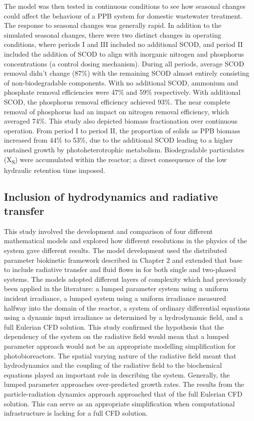 The model was then tested in continuous conditions to see how seasonal changes could affect the behaviour of a PPB system for domestic wastewater treatment. The response to seasonal changes was generally rapid. In addition to the simulated seasonal changes, there were two distinct changes in operating conditions, where periods I and III included no additional SCOD, and period II included the addition of SCOD to align with inorganic nitrogen and phosphorus concentrations (a control dosing mechanism). During all periods, average SCOD removal didn't change (87\%) with the remaining SCOD almost entirely consisting of non-biodegradable components. With no additional SCOD, ammonium and phosphate removal efficiencies were 47\% and 59\% respectively. With additional SCOD, the phosphorus removal efficiency achieved 93\%. The near complete removal of phosphorus had an impact on nitrogen removal efficiency, which averaged 74\%. This study also depicted biomass fractionation over continuous operation. From period I to period II, the proportion of solids as PPB biomass increased from 44\% to 53\%, due to the additional SCOD leading to a higher sustained growth by photoheterotrophic metabolism. Biodegradable particulates (X\textsubscript{S}) were accumulated within the reactor; a direct consequence of the low hydraulic retention time imposed. 



\subsection{Inclusion of hydrodynamics and radiative transfer}
This study involved the development and comparison of four different mathematical models and explored how different resolutions in the physics of the system gave different results. The model development used the distributed parameter biokinetic framework described in Chapter 2 and extended that base to include radiative transfer and fluid flows in for both single and two-phased systems. 
\skippingparagraph
The models adopted different layers of complexity which had previously been applied in the literature: a lumped parameter system using a uniform incident irradiance, a lumped system using a uniform irradiance measured halfway into the domain of the reactor, a system of ordinary differential equations using a dynamic input irradiance as determined by a hydrodynamic field, and a full Eulerian CFD solution. 
\skippingparagraph
This study confirmed the hypothesis that the dependency of the system on the radiative field would mean that a lumped parameter approach would not be an appropriate modelling simplification for photobioreactors. The spatial varying nature of the radiative field meant that hydrodynamics and the coupling of the radiative field to the biochemical equations played an important role in describing the system. Generally, the lumped parameter approaches over-predicted growth rates. The results from the particle-radiation dynamics approach approached that of the full Eulerian CFD solution. This can serve as an appropriate simplification when computational infrastructure is lacking for a full CFD solution. 

